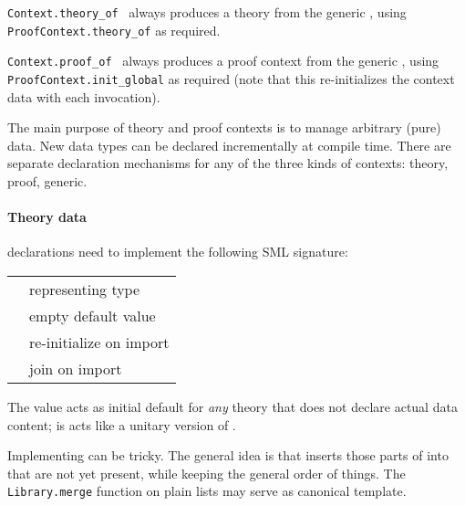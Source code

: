 \begin{isabellebody}
\begin{isamarkuptext}
\begin{description}
  \item \verb|Context.theory_of|~ always produces a
  theory from the generic , using \verb|ProofContext.theory_of| as required.

  \item \verb|Context.proof_of|~ always produces a
  proof context from the generic , using \verb|ProofContext.init_global| as required (note that this re-initializes the
  context data with each invocation).

  \end{description}%
\end{isamarkuptext}%
\isamarkuptrue%
%
\endisatagmlref
{\isafoldmlref}%
%
\isadelimmlref
%
\endisadelimmlref
%
\isamarkuptrue%
%
\begin{isamarkuptext}%
The main purpose of theory and proof contexts is to manage
  arbitrary (pure) data.  New data types can be declared incrementally
  at compile time.  There are separate declaration mechanisms for any
  of the three kinds of contexts: theory, proof, generic.

  \paragraph{Theory data} declarations need to implement the following
  SML signature:

  \medskip
  \begin{tabular}{ll}
  \isa{{\isasymtype}\ T} & representing type \\
  \isa{{\isasymval}\ empty{\isacharcolon}\ T} & empty default value \\
  \isa{{\isasymval}\ extend{\isacharcolon}\ T\ {\isasymrightarrow}\ T} & re-initialize on import \\
  \isa{{\isasymval}\ merge{\isacharcolon}\ T\ {\isasymtimes}\ T\ {\isasymrightarrow}\ T} & join on import \\
  \end{tabular}
  \medskip

  The  value acts as initial default for \emph{any}
  theory that does not declare actual data content; 
  is acts like a unitary version of .

  Implementing  can be tricky.  The general idea is
  that  inserts those parts of  into  that are not yet present, while
  keeping the general order of things.  The \verb|Library.merge|
  function on plain lists may serve as canonical template.


\end{isamarkuptext}
\end{isabellebody}
